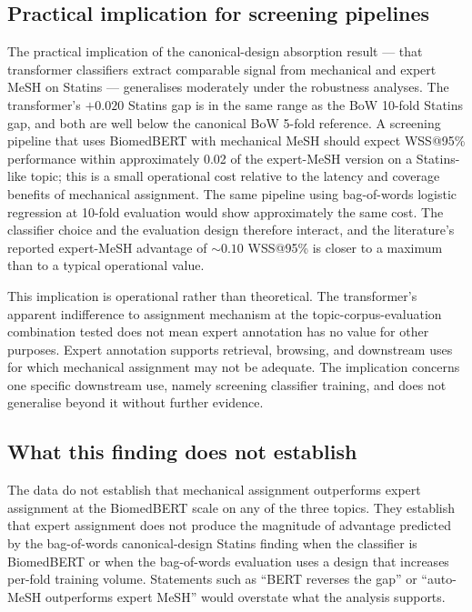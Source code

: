 \documentclass[11pt,a4paper]{article}
\begin{document}
\subsection{Practical implication for screening pipelines}

The practical implication of the canonical-design absorption result --- that transformer classifiers extract comparable signal from mechanical and expert MeSH on Statins --- generalises moderately under the robustness analyses. The transformer's $+0.020$ Statins gap is in the same range as the BoW 10-fold Statins gap, and both are well below the canonical BoW 5-fold reference. A screening pipeline that uses BiomedBERT with mechanical MeSH should expect WSS@95\% performance within approximately 0.02 of the expert-MeSH version on a Statins-like topic; this is a small operational cost relative to the latency and coverage benefits of mechanical assignment. The same pipeline using bag-of-words logistic regression at 10-fold evaluation would show approximately the same cost. The classifier choice and the evaluation design therefore interact, and the literature's reported expert-MeSH advantage of $\sim 0.10$ WSS@95\% is closer to a maximum than to a typical operational value.

This implication is operational rather than theoretical. The transformer's apparent indifference to assignment mechanism at the topic-corpus-evaluation combination tested does not mean expert annotation has no value for other purposes. Expert annotation supports retrieval, browsing, and downstream uses for which mechanical assignment may not be adequate. The implication concerns one specific downstream use, namely screening classifier training, and does not generalise beyond it without further evidence.

\subsection{What this finding does not establish}

The data do not establish that mechanical assignment outperforms expert assignment at the BiomedBERT scale on any of the three topics. They establish that expert assignment does not produce the magnitude of advantage predicted by the bag-of-words canonical-design Statins finding when the classifier is BiomedBERT or when the bag-of-words evaluation uses a design that increases per-fold training volume. Statements such as ``BERT reverses the gap'' or ``auto-MeSH outperforms expert MeSH'' would overstate what the analysis supports.
\end{document}
